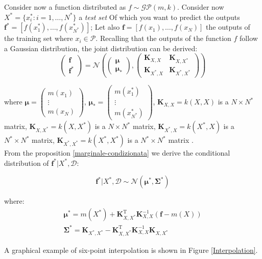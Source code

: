 \newpage
Consider now a function distributed as $f\sim \mathcal{GP}(m,k)$. 
Consider now $X^*=\{x_i^*:i=1,\dots,N^*\}$ a \textit{test set} Of which you want to predict the outputs $\bm{f^*}=\left[f(x^*_1), \dots, f(x^*_{N^*}) \right]$; Let also  $\bm{f}=\left[f(x_1), \dots, f(x_N) \right]$ the outputs of the training set where $x_i\in \mathcal{P}$. Recalling that the outputs of the function $f$ follow a Gaussian distribution, the joint distribution can be derived:
\[
\begin{pmatrix}
\bm{f}\\
\bm{f^*}
\end{pmatrix}
=
\mathcal{N}\left(
\begin{pmatrix}
\bm{\mu}\\
\bm{\mu_*}
\end{pmatrix},
\begin{pmatrix}
\bm{K}_{X,X} & \bm{K}_{X,X^*}\\
\bm{K}_{X^*,X} & \bm{K}_{X^*,X^*}
\end{pmatrix}
\right)
\]

where $\bm{\mu}=\begin{pmatrix}m(x_1) \\ \vdots \\ m(x_N)\end{pmatrix}$, $\bm{\mu_*}=\begin{pmatrix}m(x^*_1) \\ \vdots \\ m(x^*_{N^*})\end{pmatrix}$, $\bm{K}_{X,X}=k(X,X)$ is a $N\times N^*$ matrix, $\bm{K}_{X,X^*}=k(X,X^*)$ is a $N\times N^*$ matrix, $\bm{K}_{X^*,X}=k(X^*,X)$ is a $N^*\times N^*$ matrix, $\bm{K}_{X^*,X^*}=k(X^*,X^*)$ is a $N^*\times N^*$ matrix .\\

From the proposition \ref{marginale-condizionata} we derive the conditional distribution of $\bm{f^*} | X^*, \mathcal{D}$:

\[
\bm{f^*} | X^*, \mathcal{D} \sim \mathcal{N}(\bm{\mu^*}, \bm{\Sigma^*})
\]

where:
\[
\begin{split}
\bm{\mu^*}=m(X^*)+\bm{K}_{X,X^*}^\text{T}\bm{K}^{-1}_{X,X}(\bm{f}-m(X))\\
\bm{\Sigma^*}=\bm{K}_{X^*,X^*}-\bm{K}_{X,X^*}^\text{T}\bm{K}^{-1}_{X,X}\bm{K}_{X,X^*}
\end{split}
\]


\newpage 
A graphical example of six-point interpolation is shown in Figure \ref{Interpolation}.


